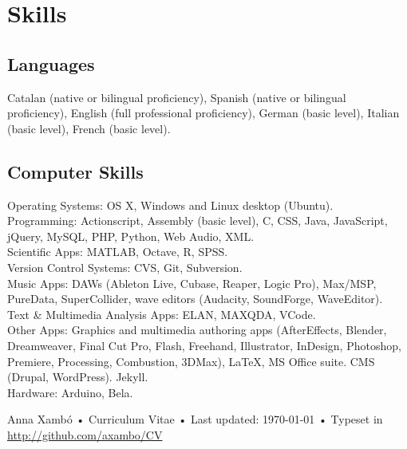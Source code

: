 \documentclass[10pt, a4paper]{article}
\begin{document}
\section*{Skills}
\noindent

\subsection*{Languages}
\noindent

Catalan (native or bilingual proficiency), Spanish (native or bilingual proficiency), English (full professional proficiency), German (basic level), Italian (basic level), French (basic level).

\subsection*{Computer Skills}
\noindent

Operating Systems: OS X, Windows and Linux desktop (Ubuntu).\\
Programming: Actionscript, Assembly (basic level), C, CSS, Java, JavaScript, jQuery, MySQL, PHP, Python, Web Audio, XML.\\
Scientific Apps: MATLAB, Octave, R, SPSS.\\
Version Control Systems: CVS, Git, Subversion.\\
Music Apps: DAWs (Ableton Live, Cubase, Reaper, Logic Pro), Max/MSP, PureData, SuperCollider, wave editors (Audacity, SoundForge, WaveEditor).\\
Text \& Multimedia Analysis Apps: ELAN, MAXQDA, VCode.\\
Other Apps: Graphics and multimedia authoring apps (AfterEffects, Blender, Dreamweaver, Final Cut Pro, Flash, Freehand, Illustrator, InDesign, Photoshop, Premiere, Processing, Combustion, 3DMax), LaTeX, MS Office suite. CMS (Drupal, WordPress). Jekyll.\\
Hardware: Arduino, Bela.

\vfill{}

\begin{center}
{\scriptsize  Anna Xambó •\- Curriculum Vitae •\- Last updated: \today\- •\- %
Typeset in \href{http://nitens.org/taraborelli/cvtex}{
\XeTeX }\\
\href{http://github.com/axambo/CV}{http://github.com/axambo/CV}}
\end{center}
\end{document}
